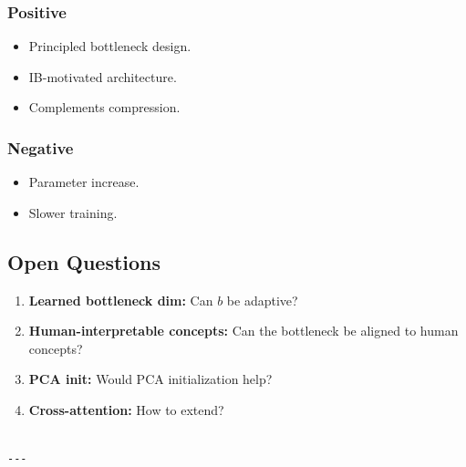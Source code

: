\subsubsection{Positive}
\begin{itemize}
\item Principled bottleneck design.
\item IB-motivated architecture.
\item Complements compression.

\end{itemize}
\subsubsection{Negative}
\begin{itemize}
\item Parameter increase.
\item Slower training.

\end{itemize}
\subsection{Open Questions}

\begin{enumerate}
\item \textbf{Learned bottleneck dim:} Can $b$ be adaptive?
\item \textbf{Human-interpretable concepts:} Can the bottleneck be aligned to human concepts?
\item \textbf{PCA init:} Would PCA initialization help?
\item \textbf{Cross-attention:} How to extend?
\end{enumerate}
\begin{lstlisting}

---
\end{lstlisting}